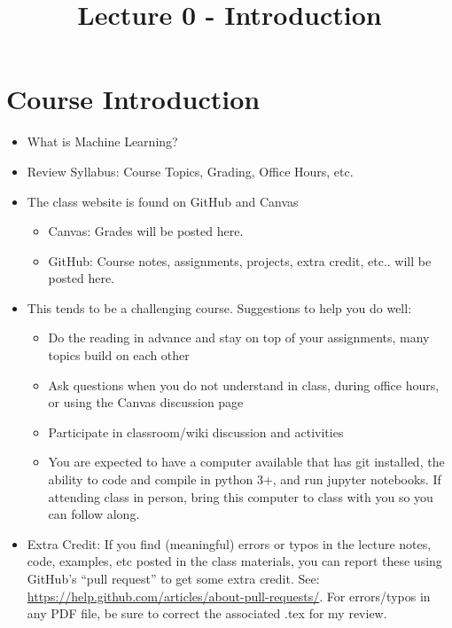 \documentclass[11pt]{amsart}
\title{Lecture 0  - Introduction }
\begin{document}
\maketitle

\section{Course Introduction}
\begin{itemize}
	\item What is Machine Learning? 
	\item Review Syllabus: Course Topics, Grading, Office Hours, etc.
	\item The class website is found on GitHub and Canvas
	\begin{itemize}
		\item Canvas: Grades will be posted here. 
		\item GitHub: Course notes, assignments, projects, extra credit, etc.. will be posted here. 
	\end{itemize}
	\item This tends to be a challenging course.  Suggestions to help you do well: 
	\begin{itemize}
		\item Do the reading in advance and stay on top of your assignments, many topics build on each other 
		\item Ask questions when you do not understand in class, during office hours, or using the Canvas discussion page
		\item Participate in classroom/wiki discussion and activities
		\item You are expected to have a computer available that has git installed, the ability to code and compile in python 3+, and run jupyter notebooks.  If attending class in person, bring this computer to class with you so you can follow along. 
	\end{itemize}
	\item Extra Credit: If you find (meaningful) errors or typos in the lecture notes, code, examples, etc posted in the class materials, you can report these using GitHub's ``pull request'' to get some extra credit.  See: \url{https://help.github.com/articles/about-pull-requests/}.  For errors/typos in any PDF file, be sure to correct the associated .tex for my review. 
\end{itemize}
\end{document}
